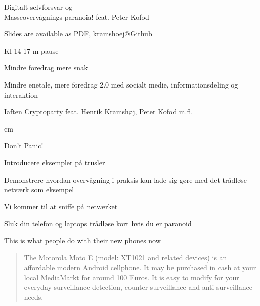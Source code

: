 \documentclass[20pt,landscape,a4paper,footrule]{foils}
\begin{document}

\mytitlepage
{Digitalt selvforsvar og\\
Masseovervågnings-paranoia! feat. Peter Kofod}


\vskip 2cm
\centerline{\footnotesize Slides are available as PDF, kramshoej@Github}

\LogoOn

{}


\begin{list1}
\item Kl 14-17 m pause
\item Mindre foredrag mere snak
\item Mindre enetale, mere foredrag 2.0 med socialt medie, informationsdeling og interaktion
\item Iaften Cryptoparty feat. Henrik Kramshøj, Peter Kofod m.fl.
\end{list1}

 cm

\centerline{\color{titlecolor}\LARGE Don't Panic!}


\begin{list1}
\item Introducere eksempler på trusler
\item Demonstrere hvordan overvågning i praksis kan lade sig gøre med det trådløse netværk som eksempel
\end{list1}

\centerline{\color{red} Vi kommer til at sniffe på netværket}

Sluk din telefon og laptops trådløse kort hvis du er paranoid \smiley



\centerline{This is what people do with their new phones now}



\begin{quote}
The Motorola Moto E (model: XT1021 and related devices) is an affordable modern Android cellphone. It may be purchased in cash at your local MediaMarkt for around 100 Euros. It is easy to modify for your everyday surveillance detection, counter-surveillance and anti-surveillance needs.
\end{quote}
\end{document}
